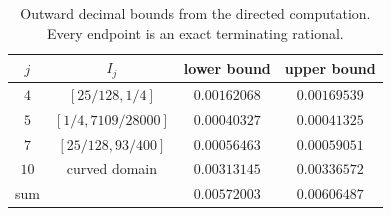 \begin{table}[ht]
\centering
\caption{Outward decimal bounds from the directed computation. Every
endpoint is an exact terminating rational.}
\label{tab:app-h6-profile-bounds}
\begin{tabular}{cccc}
\hline
$j$ & $I_j$ & lower bound & upper bound\\
\hline
$4$ & $[25/128,1/4]$ & $0.00162068$ & $0.00169539$\\
$5$ & $[1/4,7109/28000]$ & $0.00040327$ & $0.00041325$\\
$7$ & $[25/128,93/400]$ & $0.00056463$ & $0.00059051$\\
$10$ & curved domain & $0.00313145$ & $0.00336572$\\
\hline
sum & & $0.00572003$ & $0.00606487$\\
\hline
\end{tabular}
\end{table}


